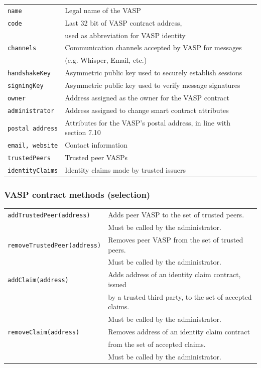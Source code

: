 \documentclass{article}
\begin{document}
\begin{tabular}{ l l }
\verb+name+&Legal name of the VASP\\[1ex]
\verb+code+&Last 32 bit of VASP contract address,\\
    &used as abbreviation for VASP identity\\[1ex]
\verb+channels+&Communication channels accepted by VASP for messages\\
    &(e.g. Whisper, Email, etc.)\\[1ex]
\verb+handshakeKey+&Asymmetric public key used to securely establish sessions\\[1ex]
\verb+signingKey+&Asymmetric public key used to verify message signatures\\[1ex]
\verb+owner+&Address assigned as the owner for the VASP contract\\[1ex]
\verb+administrator+&Address assigned to change smart contract attributes\\[1ex]
\verb+postal address+&Attributes for the VASP’s postal address, in line with section 7.10\\[1ex]
\verb+email, website+&Contact information\\[1ex]
\verb+trustedPeers+&Trusted peer VASPs\\[1ex]
\verb+identityClaims+&Identity claims made by trusted issuers\\[1ex]
\end{tabular}

\subsubsection{VASP contract methods (selection)}

\begin{tabular}{ l l }

\verb+addTrustedPeer(address)+&Adds peer VASP to the set of trusted peers.\\
    &Must be called by the administrator.\\[1ex]
\verb+removeTrustedPeer(address)+&Removes peer VASP from the set of trusted peers.\\
    &Must be called by the administrator.\\[1ex]
\verb+addClaim(address)+&Adds address of an identity claim contract, issued\\
    &by a trusted third party, to the set of accepted claims.\\ 
    &Must be called by the administrator.\\[1ex]
\verb+removeClaim(address)+&Removes address of an identity claim contract\\
    &from the set of accepted claims.\\
    &Must be called by the administrator.\\[1ex]

\end{tabular}
\end{document}
